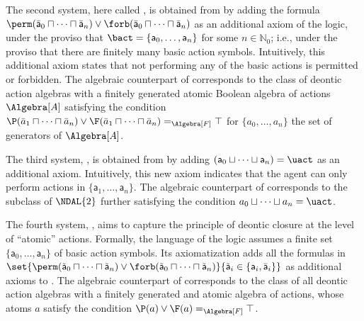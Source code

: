 
The second system, here called , is obtained from  by adding the formula $\perm(\bar{\mathsf{a}}_0 \sqcap \dots \sqcap \bar{\mathsf{a}}_n) \lor \forb(\bar{\mathsf{a}}_0 \sqcap \dots \sqcap \bar{\mathsf{a}}_n)$ as an additional axiom of the logic, under the proviso that $\bact = \{\mathsf{a}_0, \dots, \mathsf{a}_n\}$ for some $n \in \mathbb{N}_0$; i.e., under the proviso that there are finitely many basic action symbols.
Intuitively, this additional axiom states that not performing any of the basic actions is permitted or forbidden.
The algebraic counterpart of  corresponds to the class of deontic action algebras with a finitely generated atomic Boolean algebra of actions $\Algebra[A]$ satisfying the condition ${
	\P(%
		\bar{a}_1 \sqcap
		\dots \sqcap
		\bar{a}_n
	)
	\lor
	\F(%
		\bar{a}_1 \sqcap
		\dots \sqcap
		\bar{a}_n
	) =_{\Algebra[F]} \top}$
for $\{a_0, \dots, a_n\}$ the set of generators of $\Algebra[A]$.

The third system, , is obtained from  by adding $(\mathsf{a}_0 \sqcup \dots \sqcup \mathsf{a}_n) = \uact$ as an additional axiom.
Intuitively, this new axiom indicates that the agent can only perform actions in $\{\mathsf{a}_1,\dots, \mathsf{a}_n\}$.
The algebraic counterpart of  corresponds to the subclass of $\NDAL{2}$ further satisfying the condition $a_0 \sqcup \dots \sqcup a_n = \uact$. 

The fourth system, , aims to capture the principle of deontic closure at the level of ``atomic'' actions.
Formally, the language of the logic assumes a finite set $\{\mathsf{a}_0, \dots, \mathsf{a}_n\}$ of basic action symbols.
Its axiomatization adds all the formulas in
	$\set
		{\perm({\tilde{\mathsf{a}}_0} \sqcap \dots \sqcap {\tilde{\mathsf{a}}_n}) \lor \forb({\tilde{\mathsf{a}}_0} \sqcap \dots \sqcap {\tilde{\mathsf{a}}_n})}
		{\tilde{\mathsf{a}}_i \in \{\mathsf{a}_i, \bar{\mathsf{a}}_i\}}$ as additional axioms to \DAL.
The algebraic counterpart of  corresponds to the class of all deontic action algebras with a finitely generated and atomic algebra of actions, whose atoms $a$ satisfy the condition ${\P(a) \lor \F(a) =_{\Algebra[F]} \top}$.

